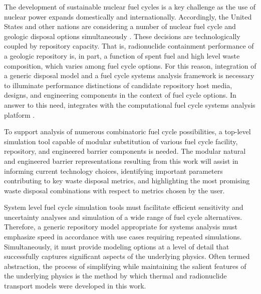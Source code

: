
The development of sustainable nuclear fuel cycles is a key challenge as the 
use of nuclear power expands domestically and internationally.  Accordingly, 
the United States and other nations are considering a number of nuclear fuel 
cycle and geologic disposal options simultaneously \cite{doe_strategy_2013, 
von_lensa_red-impact_2008}.  These decisions 
are technologically coupled by repository capacity. That is, 
radionuclide containment performance of a geologic repository is, in part, a function of 
spent fuel and high level waste composition, which varies among fuel cycle 
options. For this reason, integration of a generic disposal model and a fuel 
cycle systems analysis framework is necessary to illuminate performance 
distinctions of candidate repository host media, designs, and engineering 
components in the context of fuel cycle options.  In answer to this need, \Cyder 
integrates with the \Cyclus computational fuel cycle systems analysis platform 
\cite{huff_cyder_2013,wilson_cyclus:_2012}. 



To support analysis of numerous combinatoric fuel cycle possibilities, a 
top-level simulation tool capable of modular substitution of various fuel cycle 
facility, repository, and engineered barrier components is needed. The modular 
natural and engineered barrier representations resulting from this work will assist in 
informing current technology choices, identifying important parameters 
contributing to key waste disposal metrics, and highlighting the most promising 
waste disposal combinations with respect to metrics chosen by the user. 


System level fuel cycle simulation tools must facilitate efficient sensitivity 
and uncertainty analyses and simulation of a wide range of fuel cycle 
alternatives. Therefore, a generic repository model appropriate for systems 
analysis must emphasize speed in accordance with use cases requiring repeated 
simulations. Simultaneously, it must provide modeling options at a level of 
detail that successfully captures significant aspects of the underlying 
physics.  Often termed abstraction, the process of simplifying while 
maintaining the salient features of the underlying physics is the method by 
which thermal and radionuclide transport models were developed in this work. 


